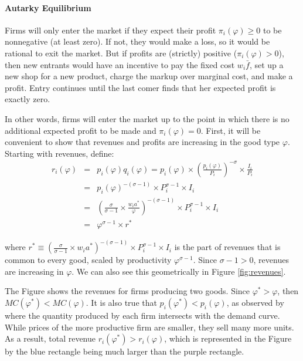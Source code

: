 \documentclass[11pt,letterpaper]{article}
\begin{document}
\paragraph{Autarky Equilibrium} Firms will only enter the market if they expect their profit $\pi_i(\varphi) \ge0$ to be nonnegative (at least zero). If not, they would make a loss, so it would be rational to exit the market. But if profits are (strictly) positive ($\pi_i(\varphi) >0$), then new entrants would have an incentive to pay the fixed cost $w_i \bar{f}$, set up a new shop for a new product, charge the markup over marginal cost, and make a profit. Entry continues until the last comer finds that her expected profit is exactly zero.

In other words, firms will enter the market up to the point in which there is no additional expected profit to be made and $\pi_i(\varphi) =0$. First, it will be convenient to show that revenues and profits are increasing in the good type $\varphi$. Starting with revenues, define:
\begin{eqnarray*}
    r_i(\varphi) &=& p_i(\varphi)q_i(\varphi) = p_i(\varphi)\times \left( \frac{p_i(\varphi)}{P_i} \right)^{-\sigma} \times \frac{I_i}{P_i}  \\
    &=&  p_i(\varphi)^{-(\sigma-1)} \times P_i^{\sigma-1}\times I_i \\
    &=&  \left( \frac{\sigma}{\sigma-1} \times  \frac{w_ia^*}{\varphi}  \right)^{-(\sigma-1)} \times P_i^{\sigma-1}\times I_i \\
    &=&  \varphi^{\sigma-1} \times r^*
\end{eqnarray*}

\noindent where $r^* \equiv \left( \frac{\sigma}{\sigma-1} \times  w_ia^*  \right)^{-(\sigma-1)} \times P_i^{\sigma-1}\times I_i$ is the part of revenues that is common to every good, scaled by productivity $\varphi^{\sigma-1}$. Since $\sigma-1>0$, revenues are increasing in $\varphi$. We can also see this geometrically in Figure \ref{fig:revenues}.

The Figure shows the revenues for firms producing two goods. Since $\varphi^*>\varphi$, then $MC(\varphi^*) <MC(\varphi)$. It is also true that $p_i(\varphi^*) <p_i(\varphi)$, as observed by where the quantity produced by each firm intersects with the demand curve. While prices of the more productive firm are smaller, they sell many more units. As a result, total revenue $r_i(\varphi^*)>r_i(\varphi)$, which is represented in the Figure by the blue rectangle being much larger than the purple rectangle. 
\end{document}
